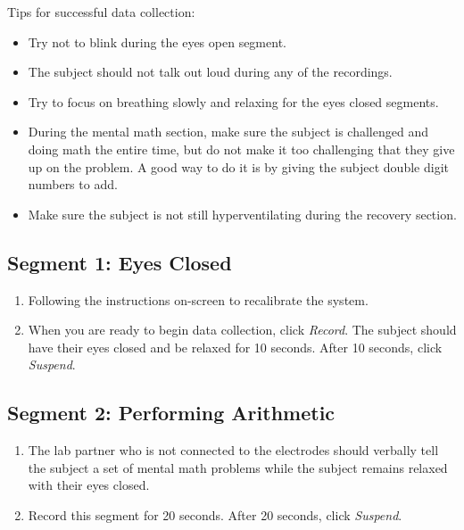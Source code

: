 \documentclass{article}
\begin{document}
Tips for successful data collection:
\begin{itemize}
	\item Try not to blink during the eyes open segment.
	\item The subject should not talk out loud during any of the recordings.
	\item Try to focus on breathing slowly and relaxing for the eyes closed segments.
	\item During the mental math section, make sure the subject is challenged and doing math the entire time, but do not make it too challenging that they give up on the problem. A good way to do it is by giving the subject double digit numbers to add.
	\item Make sure the subject is not still hyperventilating during the recovery section.
\end{itemize}

\subsection*{Segment 1: Eyes Closed}
\begin{enumerate}
	\item Following the instructions on-screen to recalibrate the system.
	\item When you are ready to begin data collection, click \textit{Record}. The subject should have their eyes closed and be relaxed for 10 seconds. After 10 seconds, click \textit{Suspend}.
\end{enumerate}

\subsection*{Segment 2: Performing Arithmetic}
\begin{enumerate}
	\item The lab partner who is not connected to the electrodes should verbally tell the subject a set of mental math problems while the subject remains relaxed with their eyes closed.
	\item Record this segment for 20 seconds. After 20 seconds, click \textit{Suspend}.
\end{enumerate}
\end{document}

